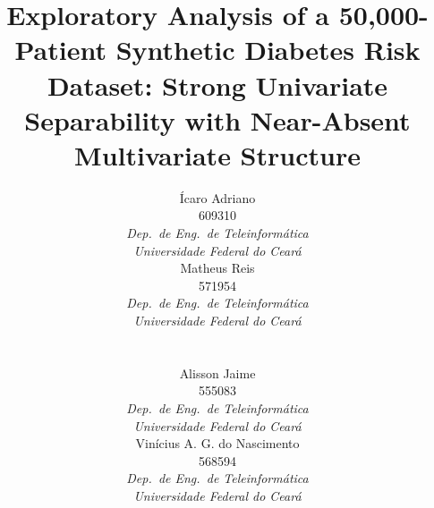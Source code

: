 \documentclass[conference]{IEEEtran}
\begin{document}
\title{Exploratory Analysis of a 50{,}000-Patient Synthetic Diabetes
Risk Dataset: Strong Univariate Separability with Near-Absent
Multivariate Structure}

\newcommand{\autorbloco}[2]{%
  \begin{minipage}[t]{0.46\textwidth}\centering
  {\normalsize #1}\\[0.35em]
  {\small #2\\
  \textit{Dep.\ de Eng.\ de Teleinformática}\\
  \textit{Universidade Federal do Ceará}}
  \end{minipage}}

\author{%
\parbox{\textwidth}{\centering
\autorbloco{Ícaro Adriano}{609310}\hfill\autorbloco{Matheus Reis}{571954}\\[1.4em]
\autorbloco{Alisson Jaime}{555083}\hfill\autorbloco{Vinícius A. G. do Nascimento}{568594}}
}

\maketitle
\end{document}
